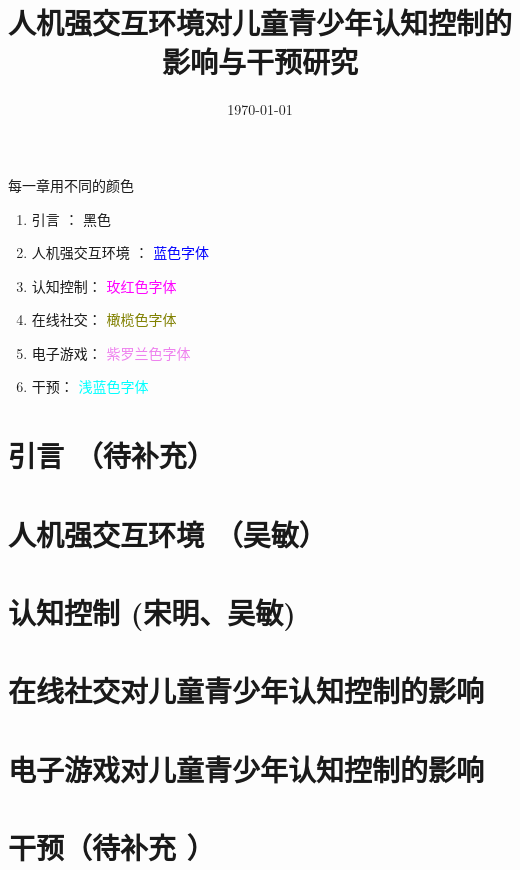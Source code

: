 \documentclass[12pt]{book}
\title{人机强交互环境对儿童青少年认知控制的影响与干预研究}
\date{\today}
\begin{document}
\maketitle

\tableofcontents

\newpage


每一章用不同的颜色
\begin{enumerate}
\item 引言 ：  黑色
\item 人机强交互环境 ： \textcolor{blue}{蓝色字体}
\item 认知控制： \textcolor{magenta}{ 玫红色字体}
\item 在线社交：  \textcolor{olive}{橄榄色字体}
\item 电子游戏： \textcolor{violet}{紫罗兰色字体}
\item 干预：\textcolor{cyan}{ 浅蓝色字体}
\end{enumerate}

\color{black}
\chapter{引言 （待补充）}




\color{black}
\chapter{人机强交互环境 （吴敏）
}



\color{black}
\chapter{认知控制  {(宋明、吴敏)}
}


\color{black}
\chapter{在线社交对儿童青少年认知控制的影响}


\color{black}
\chapter{电子游戏对儿童青少年认知控制的影响}


\color{black}
\chapter{干预（待补充 ）}






\end{document}
